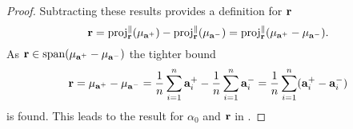 \begin{proof}
    Subtracting these results provides a definition for $\mathbf{r}$
    \begin{equation*}
        \mathbf{r} = \text{proj}_{\mathbf{r}}^{\parallel}(\mu_{\mathbf{a}^+}) - \text{proj}_{\mathbf{r}}^{\parallel}(\mu_{\mathbf{a}^-}) = \text{proj}_{\mathbf{r}}^{\parallel}(\mu_{\mathbf{a}^+} - \mu_{\mathbf{a}^-}).
    \end{equation*}
    As $\mathbf{r} \in \text{span}(\mu_{\mathbf{a}^+} - \mu_{\mathbf{a}^-})$ the tighter bound
    \begin{equation*}
        \mathbf{r} = \mu_{\mathbf{a}^+} - \mu_{\mathbf{a}^-} = \frac{1}{n}\sum_{i=1}^{n}\mathbf{a}_i^+ - \frac{1}{n}\sum_{i=1}^{n}\mathbf{a}_i^- = \frac{1}{n}\sum_{i=1}^{n}(\mathbf{a}_i^+ - \mathbf{a}_i^-)
    \end{equation*}
    is found.
    This leads to the result for $\alpha_0$ and $\mathbf{r}$ in .
\end{proof}
